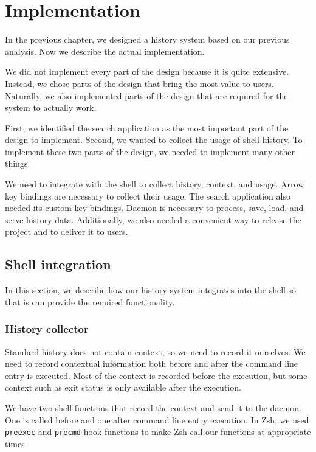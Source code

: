 
\chapter{Implementation}

In the previous chapter, we designed a history system based on our previous analysis. Now we describe the actual implementation. 

We did not implement every part of the design because it is quite extensive. Instead, we chose parts of the design that bring the most value to users. Naturally, we also implemented parts of the design that are required for the system to actually work.

First, we identified the search application as the most important part of the design to implement. Second, we wanted to collect the usage of shell history. To implement these two parts of the design, we needed to implement many other things. 

We need to integrate with the shell to collect history, context, and usage. Arrow key bindings are necessary to collect their usage. The search application also needed its custom key bindings. Daemon is necessary to process, save, load, and serve history data. Additionally, we also needed a convenient way to release the project and to deliver it to users.

\section{Shell integration}

In this section, we describe how our history system integrates into the shell so that is can provide the required functionality. 

\subsection{History collector}

Standard history does not contain context, so we need to record it ourselves. 
We need to record contextual information both before and after the command line entry is executed. Most of the context is recorded before the execution, but some context such as exit status is only available after the execution. 

We have two shell functions that record the context and send it to the daemon. One is called before and one after command line entry execution. In Zsh, we used \verb|preexec| and \verb|precmd| hook functions to make Zsh call our functions at appropriate times. 


